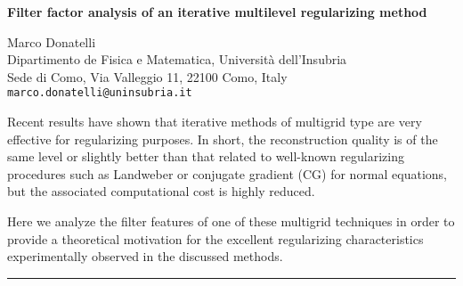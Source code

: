 \documentclass[twosided]{report}
\begin{document}
\begin{center}
{\large			%
{\bf Filter factor analysis of an iterative multilevel regularizing method}}

	Marco Donatelli \\
	Dipartimento de Fisica e Matematica,
	Universit\`a dell'Insubria \\
	Sede di Como, Via Valleggio 11, 22100 Como, Italy \\
	{\tt marco.donatelli@uninsubria.it}
\end{center}
Recent results have shown that iterative methods of multigrid
type are very effective for regularizing purposes.
In short, the reconstruction quality is of the same level
or slightly better than that related to well-known
regularizing procedures such as Landweber or conjugate
gradient (CG) for normal equations, but the associated
computational cost is highly reduced.

Here we analyze the filter features of one of these
multigrid techniques in order to provide a theoretical
motivation for the excellent regularizing characteristics
experimentally observed in the discussed methods.


	\begin{center} \rule{6in}{1pt} \end{center}
\end{document}
